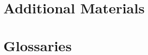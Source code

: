 \documentclass[a4paper]{ustthesis}
\begin{document}
%
%
%


\newpage

\appendix
\chapter{Additional Materials}
\label{ch_AdditionalMaterials}

\newpage


\chapter{Glossaries}
\label{ch_glossaries}

\end{document}
